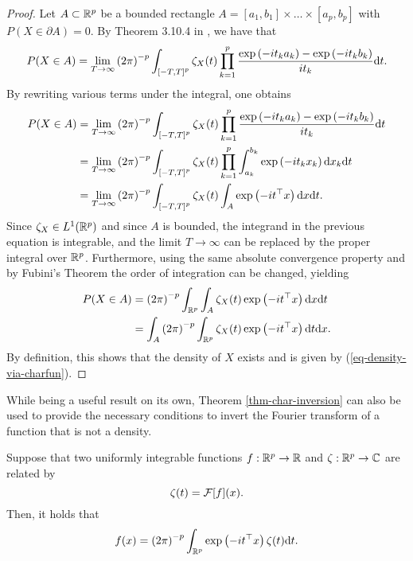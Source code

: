 \begin{proof}
    Let $A \subset \Rp$ be a bounded rectangle $A = [a_1, b_1] \times \ldots \times [a_p, b_p]$ with $P(X \in \partial A) = 0$. By Theorem 3.10.4 in \cite{durrett_2019}, we have that
    \begin{equation*}
        P(X \in A) = \lim_{T \rightarrow \infty} \left(2\pi\right)^{-p}\int_{\left[-T, T\right]^p} \zeta_X(t) \prod_{k=1}^p \frac{\expf{-it_k a_k} - \expf{-it_k b_k}}{i t_k} \d t.
    \end{equation*}
    By rewriting various terms under the integral, one obtains
    \begin{align*}
        P(X \in A) 
        &= \lim_{T \rightarrow \infty} \left(2\pi\right)^{-p}\int_{\left[-T, T\right]^p} \zeta_X(t) \prod_{k=1}^p \frac{\expf{-it_k a_k} - \expf{-it_k b_k}}{i t_k} \d t \\
        &= \lim_{T \rightarrow \infty} \left(2\pi\right)^{-p}\int_{\left[-T, T\right]^p} \zeta_X(t) \prod_{k=1}^p \int_{a_k}^{b_k}\expf{-i t_k x_k} \d x_k \d t \\
        &= \lim_{T \rightarrow \infty} \left(2\pi\right)^{-p}\int_{\left[-T, T\right]^p} \zeta_X(t) \int_A \expf{-i t^\top x} \d x \d t.
    \end{align*}
    Since $\zeta_X \in L^1(\Rp)$ and since $A$ is bounded, the integrand in the previous equation is integrable, and the limit $T \rightarrow \infty$ can be replaced by the proper integral over $\Rp$. Furthermore, using the same absolute convergence property and by Fubini's Theorem the order of integration can be changed, yielding
    \begin{align*}
        P(X \in A) 
        &= \left(2\pi\right)^{-p}\intRp{t}{\int_A \zeta_X(t) \expf{-i t^\top x} \d x} \\
        &= \int_A \left(2\pi\right)^{-p} \intRp{t}{\zeta_X(t) \expf{-i t^\top x} } \d x.
    \end{align*}
    By definition, this shows that the density of $X$ exists and is given by (\ref{eq-density-via-charfun}).
\end{proof}

While being a useful result on its own, Theorem \ref{thm-char-inversion} can also be used to provide the necessary conditions to invert the Fourier transform of a function that is not a density.

\begin{corollary}
    Suppose that two uniformly integrable functions $f : \Rp \rightarrow \R$ and $\zeta : \Rp \rightarrow \C$ are related by
    \begin{equation}\label{eq-fourier-trans}
        \zeta(t) = \F[f](x).
    \end{equation}
    Then, it holds that
    \begin{equation} \label{eq-fourier-inv}
        f(x) = \left(2\pi\right)^{-p}\int_\Rp \expf{-i t^\top x} \zeta(t) \d t.
    \end{equation}
\end{corollary}

